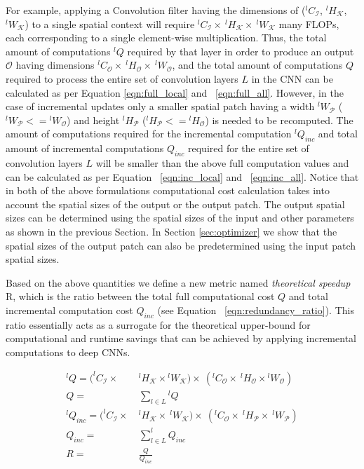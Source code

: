 For example, applying a Convolution filter having the dimensions of ($^lC_\mathcal{I}$, $^lH_{\mathcal{K}}$, $^lW_{\mathcal{K}}$) to a single spatial context will require $^lC_{\mathcal{I}} \times~ ^lH_{\mathcal{K}} \times~ ^lW_{\mathcal{K}}$ many FLOPs, each corresponding to a single element-wise multiplication.
Thus, the total amount of computations $^lQ$ required by that layer in order to produce an output $\mathcal{O}$ having dimensions $^lC_{\mathcal{O}} \times~ ^lH_{\mathcal{O}} \times~ ^lW_{\mathcal{O}}$, and the total amount of computations $Q$ required to process the entire set of convolution layers $L$ in the CNN can be calculated as per Equation \ref{eqn:full_local} and ~\ref{eqn:full_all}.
However, in the case of incremental updates only a smaller spatial patch having a width $^lW_\mathcal{P}$ ($^lW_\mathcal{P}<={}^lW_{\mathcal{O}}$) and height $^lH_\mathcal{P}$ ($^lH_\mathcal{P}<={}^lH_{\mathcal{O}}$) is needed to be recomputed.
The amount of computations required for the incremental computation $^lQ_{inc}$ and total amount of incremental computations $Q_{inc}$ required for the entire set of convolution layers $L$ will be smaller than the above full computation values and can be calculated as per Equation ~\ref{eqn:inc_local} and ~\ref{eqn:inc_all}.
Notice that in both of the above formulations computational cost calculation takes into account the spatial sizes of the output or the output patch.
The output spatial sizes can be determined using the spatial sizes of the input and other parameters as shown in the previous Section.
In Section \ref{sec:optimizer} we show that the spatial sizes of the output patch can also be predetermined using the input patch spatial sizes.

Based on the above quantities we define a new metric named \textit{theoretical speedup} R, which is the ratio between the total full computational cost $Q$ and total incremental computation cost $Q_{inc}$ (see Equation ~\ref{eqn:redundancy_ratio}).
This ratio essentially acts as a surrogate for the theoretical upper-bound for computational and runtime savings that can be achieved by applying incremental computations to deep CNNs.

\begin{align}
\label{eqn:full_local}
^lQ = (^lC_{\mathcal{I}} \times&~ ^lH_{\mathcal{K}} \times{}^lW_{\mathcal{K}}) \times~ (^lC_{\mathcal{O}} \times~ ^lH_{\mathcal{O}} \times{}^lW_{\mathcal{O}})\\
\label{eqn:full_all}
Q =&~ \sum_{l \in L}{}^lQ\\
\label{eqn:inc_local}
^lQ_{inc} = (^lC_{\mathcal{I}} \times&~ ^lH_{\mathcal{K}} \times~ ^lW_{\mathcal{K}}) \times~ (^lC_{\mathcal{O}} \times~ ^lH_{\mathcal{P}} \times~ ^lW_{\mathcal{P}})\\
\label{eqn:inc_all}
Q_{inc} =&~ \sum_{l \in L} ^lQ_{inc}\\
\label{eqn:redundancy_ratio}
R =&~ \frac{Q}{Q_{inc}}
\end{align}


